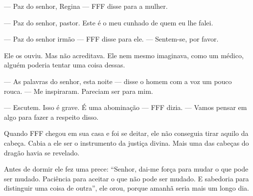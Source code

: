 --- Paz do senhor, Regina --- FFF disse para a mulher.

--- Paz do senhor, pastor. Este é o meu cunhado de quem eu lhe falei.

--- Paz do senhor irmão --- FFF disse para ele. ---  Sentem-se, por favor.

Ele os ouviu. Mas não acreditava. Ele nem mesmo imaginava, como um médico,  alguém poderia tentar uma coisa dessas.

--- As palavras do senhor, esta noite --- disse o homem com a voz um pouco rouca. --- Me inspiraram. Pareciam ser para mim.

--- Escutem. Isso é grave. É uma abominação --- FFF dizia. --- Vamos pensar em algo para fazer a respeito disso.

Quando FFF chegou em sua casa e foi se deitar, ele não conseguia tirar aquilo da cabeça. Cabia a ele ser o instrumento da justiça divina. Mais uma das cabeças do dragão havia se revelado.

Antes de dormir ele fez uma prece: ``Senhor, dai-me força para mudar o que pode ser mudado. Paciência para aceitar o que não pode ser mudado. E sabedoria para distinguir uma coisa de outra'', ele orou, porque amanhã seria mais um longo dia.
